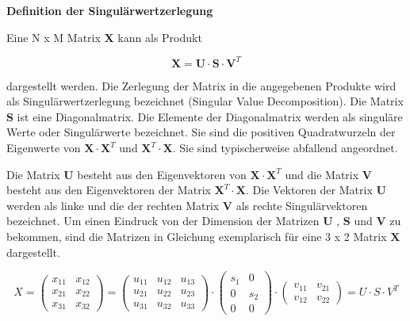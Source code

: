 \selectfont
\noindent\textbf{Definition der Singul\"{a}rwertzerlegung} \smallskip

\noindent Eine N x M Matrix \textbf{X} kann als Produkt 

\begin{equation}\label{eq:thirteenonehundredthirtytwo}
\textbf{X}=\textbf{U}\cdot \textbf{S}\cdot \textbf{V}^{T}
\end{equation}

\noindent dargestellt werden. Die Zerlegung der Matrix in die angegebenen Produkte wird als Singul\"{a}rwertzerlegung bezeichnet (Singular Value Decomposition). Die Matrix $\mathbf{S}$ ist eine Diagonalmatrix. Die Elemente der Diagonalmatrix werden als singul\"{a}re Werte oder Singul\"{a}rwerte bezeichnet. Sie sind die positiven Quadratwurzeln der Eigenwerte von $\mathbf{X}\cdot \mathbf{X}^{T}$ und $\mathbf{X}^{T}\cdot \mathbf{X}$. Sie sind typischerweise abfallend angeordnet.\newline

\noindent Die Matrix $\mathbf{U}$  besteht aus den Eigenvektoren von $\mathbf{X}\cdot\mathbf{X}^{T}$ und die Matrix $\mathbf{V}$ besteht aus den Eigenvektoren der Matrix $\mathbf{X}^{T}\cdot \mathbf{X}$. Die Vektoren der Matrix $\mathbf{U}$ werden als linke und die der rechten Matrix $\mathbf{V}$ als rechte Singul\"{a}rvektoren bezeichnet. Um einen Eindruck von der Dimension der Matrizen $\mathbf{U}$ , $\mathbf{S}$  und $\mathbf{V}$ zu bekommen, sind die Matrizen in Gleichung exemplarisch f\"{u}r eine 3 x 2 Matrix $\mathbf{X}$  dargestellt.

\begin{equation}\label{eq:thirteenonehundredthirtythree}
X=\left(\begin{array}{cc} {x_{11} } & {x_{12} } \\ {x_{21} } & {x_{22} } \\ {x_{31} } & {x_{32} } \end{array}\right)=\left(\begin{array}{ccc} {u_{11} } & {u_{12} } & {u_{13} } \\ {u_{21} } & {u_{22} } & {u_{23} } \\ {u_{31} } & {u_{32} } & {u_{33} } \end{array}\right)\cdot \left(\begin{array}{cc} {s_{1} } & {0} \\ {0} & {s_{2} } \\ {0} & {0} \end{array}\right)\cdot \left(\begin{array}{cc} {v_{11} } & {v_{21} } \\ {v_{12} } & {v_{22} } \end{array}\right)=U\cdot S\cdot V^{T}
\end{equation}

